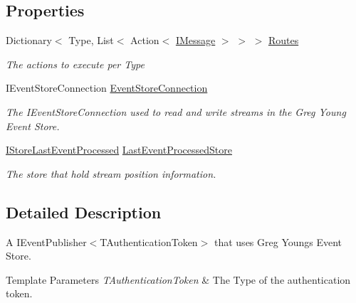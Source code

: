 \subsection*{Properties}
\begin{DoxyCompactItemize}
\item 
Dictionary$<$ Type, List$<$ Action$<$ \hyperlink{interfaceCqrs_1_1Messages_1_1IMessage}{I\+Message} $>$ $>$ $>$ \hyperlink{classCqrs_1_1EventStore_1_1Bus_1_1EventStoreEventPublisher_a89bf01d1921bc517ea8b385c0ee724ee_a89bf01d1921bc517ea8b385c0ee724ee}{Routes}
\begin{DoxyCompactList}\small\item\em The actions to execute per Type \end{DoxyCompactList}\item 
I\+Event\+Store\+Connection \hyperlink{classCqrs_1_1EventStore_1_1Bus_1_1EventStoreEventPublisher_a16df48a7203bc3bcde5f5a12f1d47934_a16df48a7203bc3bcde5f5a12f1d47934}{Event\+Store\+Connection}
\begin{DoxyCompactList}\small\item\em The I\+Event\+Store\+Connection used to read and write streams in the Greg Young Event Store. \end{DoxyCompactList}\item 
\hyperlink{interfaceCqrs_1_1Bus_1_1IStoreLastEventProcessed}{I\+Store\+Last\+Event\+Processed} \hyperlink{classCqrs_1_1EventStore_1_1Bus_1_1EventStoreEventPublisher_a552a16f86c52837bf81200778e3a9fe4_a552a16f86c52837bf81200778e3a9fe4}{Last\+Event\+Processed\+Store}
\begin{DoxyCompactList}\small\item\em The store that hold stream position information. \end{DoxyCompactList}\end{DoxyCompactItemize}


\subsection{Detailed Description}
A I\+Event\+Publisher$<$\+T\+Authentication\+Token$>$ that uses Greg Young\textquotesingle{}s Event Store. 


\begin{DoxyTemplParams}{Template Parameters}
{\em T\+Authentication\+Token} & The Type of the authentication token.\\
\hline
\end{DoxyTemplParams}


